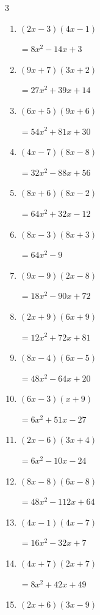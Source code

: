 \begin{multicols}{3}
\begin{enumerate}
        $=36x^{2}+10x-4$

\columnbreak %

\resetques

  \item $(2x-3)(4x-1)$

        $=8x^{2}-14x+3$

  \item $(9x+7)(3x+2)$

        $=27x^{2}+39x+14$

  \item $(6x+5)(9x+6)$

        $=54x^{2}+81x+30$

  \item $(4x-7)(8x-8)$

        $=32x^{2}-88x+56$

  \item $(8x+6)(8x-2)$

        $=64x^{2}+32x-12$

  \item $(8x-3)(8x+3)$

        $=64x^{2}-9$

  \item $(9x-9)(2x-8)$

        $=18x^{2}-90x+72$

  \item $(2x+9)(6x+9)$

        $=12x^{2}+72x+81$

  \item $(8x-4)(6x-5)$

        $=48x^{2}-64x+20$

  \item $(6x-3)(x+9)$

        $=6x^{2}+51x-27$

  \item $(2x-6)(3x+4)$

        $=6x^{2}-10x-24$

  \item $(8x-8)(6x-8)$

        $=48x^{2}-112x+64$

  \item $(4x-1)(4x-7)$

        $=16x^{2}-32x+7$

  \item $(4x+7)(2x+7)$

        $=8x^{2}+42x+49$

  \item $(2x+6)(3x-9)$


\end{enumerate}
\end{multicols}
